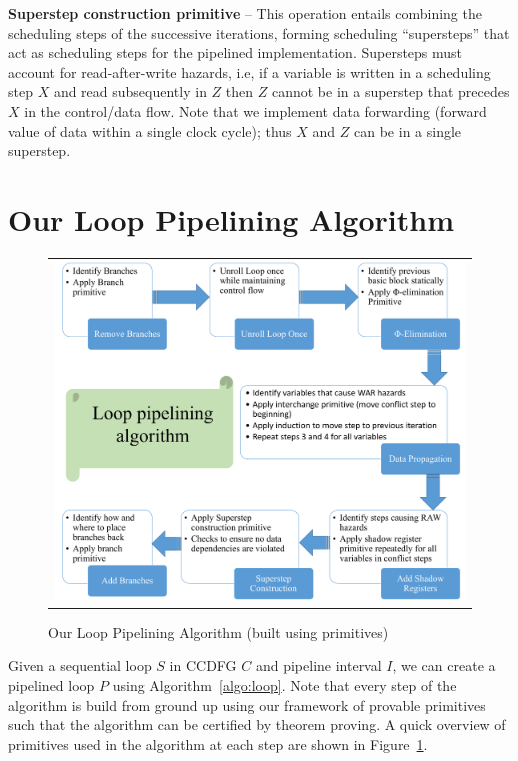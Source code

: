 {\textbf {Superstep construction primitive}} -- This operation entails combining the scheduling steps of the successive
iterations, forming scheduling ``supersteps'' that act as scheduling steps for the pipelined implementation. Supersteps must
account for read-after-write hazards, i.e, if a variable is written in a scheduling step $X$ and read subsequently in
$Z$ then $Z$ cannot be in a superstep that precedes $X$ in the control/data flow.  Note that we implement data
forwarding (forward value of data within a single clock cycle); thus $X$ and $Z$ can be in a single superstep.

\section{Our Loop Pipelining Algorithm}
\begin{figure}[t!]
\begin{center}
\begin{tabular}{c}
\includegraphics[width=5.5in]{fig-proposal/algorithm-using-primitives}
\end{tabular}
\end{center}
\caption{Our Loop Pipelining Algorithm (built using primitives)}
\label{fig:algorithm-using-primitives}
\end{figure}

Given a sequential loop $S$ in CCDFG $C$ and pipeline interval $I$, we can create a pipelined loop $P$ using Algorithm~\ref{algo:loop}. Note that every step of the algorithm is build from ground up using our framework of provable primitives such that the algorithm can be certified by theorem proving. A quick overview of primitives used in the algorithm at each step are shown in Figure~\ref{fig:algorithm-using-primitives}.

